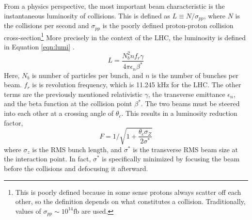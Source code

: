 From a physics perspective, the most important beam characteristic is the instantaneous luminosity of collisions.
This is defined as $L\equiv N/\sigma_{pp}$, where $N$ is the collisions per second and $\sigma_{pp}$ is the poorly defined proton-proton collision cross-section\footnote{This is poorly defined because in some sense protons always scatter off each other, so the definition depends on what constitutes a collision. Traditionally, values of $\sigma_{pp}\sim10^{14}\text{fb}$ are used.} \cite{lyndon}
More precisely in the context of the LHC, the luminosity is defined in Equation \ref{eqn:lumi} \cite{lyndon}.
\begin{equation}\label{eqn:lumi}
    L=\frac{N_b^2nf_r\gamma}{4\pi\epsilon_n\beta^*}
\end{equation}
Here, $N_b$ is number of particles per bunch, and $n$ is the number of bunches per beam.
$f_r$ is is revolution frequency, which is 11.245 kHz for the LHC.
The other terms are the previously mentioned relativistic $\gamma$, the transverse emittance $\epsilon_n$, and the beta function at the collision point $\beta^*$.
The two beams must be steered into each other at a crossing angle of $\theta_c$.
This results in a luminosity reduction factor,
\begin{equation}\label{eqn:lumiReduce}
    F=1/\sqrt{1+\frac{\theta_c\sigma_Z}{2\sigma^*}}
\end{equation}
where $\sigma_z$ is the RMS bunch length, and $\sigma^*$ is the transverse RMS beam size at the interaction point.
In fact, $\sigma^*$ is specifically minimized by focusing the beam before the collisions and defocusing it afterward.

